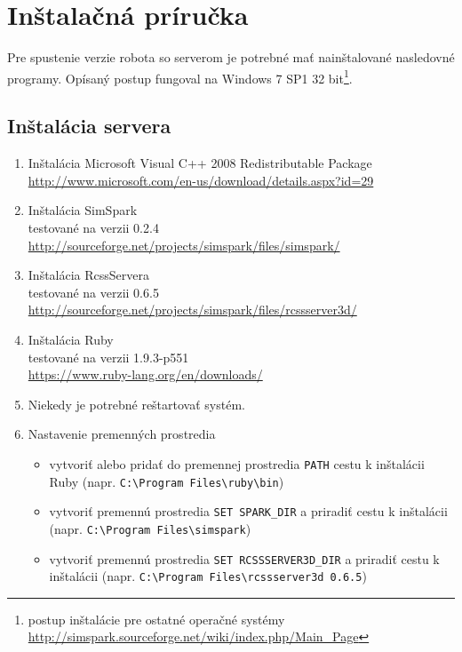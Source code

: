 \section{Inštalačná príručka} \label{appendix_install_guide}

Pre spustenie verzie robota so serverom je potrebné mať nainštalované nasledovné programy. Opísaný postup fungoval na Windows 7 SP1 32 bit\footnote{postup inštalácie pre ostatné operačné systémy \url{http://simspark.sourceforge.net/wiki/index.php/Main_Page}}.

\subsection{Inštalácia servera}
\begin{enumerate}
	\item Inštalácia Microsoft Visual C++ 2008 Redistributable Package 
	\\ \url{http://www.microsoft.com/en-us/download/details.aspx?id=29}
	\item Inštalácia SimSpark
	\\ testované na verzii 0.2.4
	\\ \url{http://sourceforge.net/projects/simspark/files/simspark/}
	\item Inštalácia RcssServera
	\\ testované na verzii 0.6.5 
	\\ \url{http://sourceforge.net/projects/simspark/files/rcssserver3d/}
	\item Inštalácia Ruby
	\\ testované na verzii 1.9.3-p551
	\\ \url{https://www.ruby-lang.org/en/downloads/}
	\item Niekedy je potrebné reštartovať systém.
	\item Nastavenie premenných prostredia
	\begin{itemize}
		\item vytvoriť alebo pridať do premennej prostredia \texttt{PATH} cestu k inštalácii Ruby (napr. \texttt{C:\textbackslash Program Files\textbackslash ruby\textbackslash bin})
		\item vytvoriť premennú prostredia \texttt{SET SPARK\_DIR} a priradiť cestu k inštalácii (napr. \texttt{C:\textbackslash Program Files\textbackslash simspark})
		\item vytvoriť premennú prostredia \texttt{SET RCSSSERVER3D\_DIR} a priradiť cestu k inštalácii (napr. \texttt{C:\textbackslash Program Files\textbackslash rcssserver3d 0.6.5})
	\end{itemize}
\end{enumerate}

